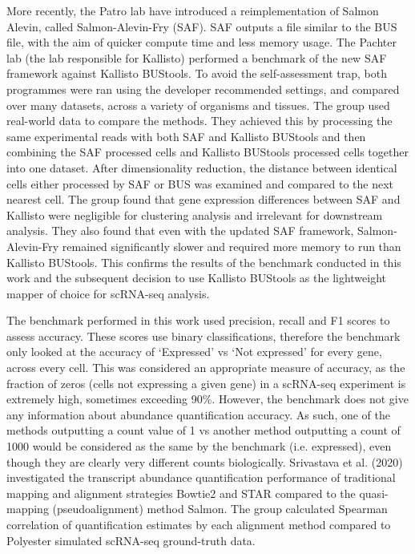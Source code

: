 More recently, the Patro lab have introduced a reimplementation of Salmon Alevin, called Salmon-Alevin-Fry (SAF)\cite{sarkar2020accurate}.
SAF outputs a file similar to the BUS file, with the aim of quicker compute time and less memory usage.
The Pachter lab (the lab responsible for Kallisto) performed a benchmark of the new SAF framework against Kallisto BUStools\cite{booeshaghi2021benchmarking}.
To avoid the self-assessment trap, both programmes were ran using the developer recommended settings, and compared over many datasets, across a variety of organisms and tissues.
The group used real-world data to compare the methods.
They achieved this by processing the same experimental reads with both SAF and Kallisto BUStools and then combining the SAF processed cells and Kallisto BUStools processed cells together into one dataset.
After dimensionality reduction, the distance between identical cells either processed by SAF or BUS was examined and compared to the next nearest cell.
The group found that gene expression differences between SAF and Kallisto were negligible for clustering analysis and irrelevant for downstream analysis.
They also found that even with the updated SAF framework, Salmon-Alevin-Fry remained significantly slower and required more memory to run than Kallisto BUStools.
This confirms the results of the benchmark conducted in this work and the subsequent decision to use Kallisto BUStools as the lightweight mapper of choice for scRNA-seq analysis.

The benchmark performed in this work used precision, recall and F1 scores to assess accuracy.
These scores use binary classifications, therefore the benchmark only looked at the accuracy of `Expressed' vs `Not expressed' for every gene, across every cell.
This was considered an appropriate measure of accuracy, as the fraction of zeros (cells not expressing a given gene) in a scRNA-seq experiment is extremely high, sometimes exceeding 90\%\cite{linderman2022zero}.
However, the benchmark does not give any information about abundance quantification accuracy.
As such, one of the methods outputting a count value of 1 vs another method outputting a count of 1000 would be considered as the same by the benchmark (i.e. expressed), even though they are clearly very different counts biologically.
Srivastava et al. (2020) investigated the transcript abundance quantification performance of traditional mapping and alignment strategies Bowtie2 and STAR compared to the quasi-mapping (pseudoalignment) method Salmon\cite{srivastava2020alignment}.
The group calculated Spearman correlation of quantification estimates by each alignment method compared to Polyester simulated scRNA-seq ground-truth data.

